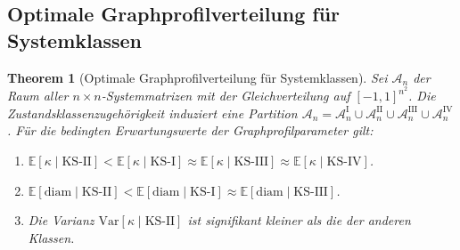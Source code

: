 \documentclass[a4paper, 12pt, twoside, openright]{report}
\newtheorem{theorem}{Theorem}[section]
\theoremstyle{definition}
\theoremstyle{definition}
\newcommand{\KS}{\mathrm{KS}}
\begin{document}
\subsection{Optimale Graphprofilverteilung für Systemklassen}

\begin{theorem}[Optimale Graphprofilverteilung für Systemklassen]
\label{thm:opt_profil}
Sei $\mathcal{A}_n$ der Raum aller $n \times n$-Systemmatrizen mit der Gleichverteilung
auf $[-1,1]^{n^2}$. Die Zustandsklassenzugehörigkeit induziert eine Partition
$\mathcal{A}_n = \mathcal{A}_n^{\mathrm{I}} \cup \mathcal{A}_n^{\mathrm{II}} \cup
\mathcal{A}_n^{\mathrm{III}} \cup \mathcal{A}_n^{\mathrm{IV}}$.
Für die bedingten Erwartungswerte der Graphprofilparameter gilt:
\begin{enumerate}[label=(\roman*)]
  \item $\mathbb{E}[\kappa \mid \KS\text{-II}] < \mathbb{E}[\kappa \mid \KS\text{-I}]
    \approx \mathbb{E}[\kappa \mid \KS\text{-III}]
    \approx \mathbb{E}[\kappa \mid \KS\text{-IV}]$.
  \item $\mathbb{E}[\mathrm{diam} \mid \KS\text{-II}] <
    \mathbb{E}[\mathrm{diam} \mid \KS\text{-I}]
    \approx \mathbb{E}[\mathrm{diam} \mid \KS\text{-III}]$.
  \item Die Varianz $\mathrm{Var}[\kappa \mid \KS\text{-II}]$ ist signifikant
    kleiner als die der anderen Klassen.
\end{enumerate}
\end{theorem}
\end{document}
